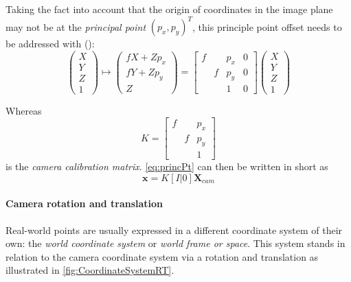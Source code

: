 Taking the fact into account that the origin of coordinates in the image plane may not be at the \textit{principal point} $(p_x, p_y)^T$, this principle point offset needs to be addressed with (\cite[p.155]{Hartley.2011}):
\begin{equation} 
 \begin{pmatrix}
  X \\
  Y \\
  Z \\
  1
 \end{pmatrix}\longmapsto
 \begin{pmatrix}
  fX+Zp_x \\
  fY+Zp_y \\
  Z
 \end{pmatrix}=
 \begin{bmatrix}
  f & & p_x & 0\\
   & f & p_y & 0 \\
   &  & 1 & 0
 \end{bmatrix}
 \begin{pmatrix}
  X \\
  Y \\
  Z \\
  1
 \end{pmatrix}\label{eq:princPt}
\end{equation} 

Whereas 
\begin{equation}
 K=
 \begin{bmatrix}
  f & & p_x\\
   & f & p_y\\
   &  & 1
 \end{bmatrix}
\end{equation}
is the \textit{camera calibration matrix}. \autoref{eq:princPt} can then be written in short as 
\begin{equation}
 \mathbf{x}=K[I|0]\mathbf{X}_{cam}\label{eq:princPtShort}
\end{equation}

\paragraph{Camera rotation and translation}
Real-world points are usually expressed in a different coordinate system of their own: the \textit{world coordinate system} or \textit{world frame or space}. This system stands in relation to the camera coordinate system via a rotation and translation as illustrated in \autoref{fig:CoordinateSystemRT}.

